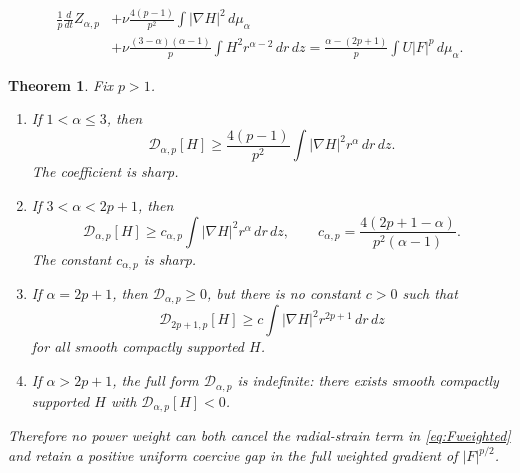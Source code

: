 \documentclass[10pt,a4paper]{amsart}
\newtheorem{theorem}{Theorem}
\begin{document}
\begin{align}
 \frac1p\frac{d}{dt}Z_{\alpha,p}
 &+\nu\frac{4(p-1)}{p^2}\int|\nabla H|^2\,d\mu_\alpha\nonumber\\
 &+\nu\frac{(3-\alpha)(\alpha-1)}p
 \int H^2r^{\alpha-2}\,dr\,dz
 =\frac{\alpha-(2p+1)}p\int U|F|^p\,d\mu_\alpha.
 \label{eq:Fweighted}
\end{align}

\begin{theorem}\label{thm:phase}
Fix \(p>1\).
\begin{enumerate}[label=\textnormal{(\roman*)}]
\item If \(1<\alpha\le3\), then
\[
 \mathcal D_{\alpha,p}[H]
 \ge \frac{4(p-1)}{p^2}\int|\nabla H|^2r^\alpha\,dr\,dz.
\]
The coefficient is sharp.
\item If \(3<\alpha<2p+1\), then
\begin{equation}\label{eq:radgap}
 \mathcal D_{\alpha,p}[H]
 \ge c_{\alpha,p}\int|\nabla H|^2r^\alpha\,dr\,dz,
 \qquad
 c_{\alpha,p}=\frac{4(2p+1-\alpha)}{p^2(\alpha-1)}.
\end{equation}
The constant \(c_{\alpha,p}\) is sharp.
\item If \(\alpha=2p+1\), then \(\mathcal D_{\alpha,p}\ge0\), but there is no constant \(c>0\) such that
\[
 \mathcal D_{2p+1,p}[H]\ge c\int|\nabla H|^2r^{2p+1}\,dr\,dz
\]
for all smooth compactly supported \(H\).
\item If \(\alpha>2p+1\), the full form \(\mathcal D_{\alpha,p}\) is indefinite: there exists smooth compactly supported \(H\) with \(\mathcal D_{\alpha,p}[H]<0\).
\end{enumerate}
Therefore no power weight can both cancel the radial-strain term in \eqref{eq:Fweighted} and retain a positive uniform coercive gap in the full weighted gradient of \(|F|^{p/2}\).
\end{theorem}
\end{document}
